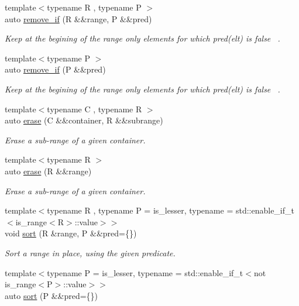 \begin{DoxyCompactItemize}
{\footnotesize template$<$typename R , typename P $>$ }\\auto \mbox{\hyperlink{namespacerah_afba9495316f20f6caee735c15feb349c}{remove\+\_\+if}} (R \&\&range, P \&\&pred)
\begin{DoxyCompactList}\small\item\em Keep at the begining of the range only elements for which pred(elt) is false~\newline
. \end{DoxyCompactList}\item 
{\footnotesize template$<$typename P $>$ }\\auto \mbox{\hyperlink{namespacerah_af598cf91c554f6d6938c320578e6bb02}{remove\+\_\+if}} (P \&\&pred)
\begin{DoxyCompactList}\small\item\em Keep at the begining of the range only elements for which pred(elt) is false~\newline
. \end{DoxyCompactList}\item 
{\footnotesize template$<$typename C , typename R $>$ }\\auto \mbox{\hyperlink{namespacerah_a3b055c0e04f784b9abc89a27ef4534dd}{erase}} (C \&\&container, R \&\&subrange)
\begin{DoxyCompactList}\small\item\em Erase a sub-\/range of a given container. \end{DoxyCompactList}\item 
{\footnotesize template$<$typename R $>$ }\\auto \mbox{\hyperlink{namespacerah_a80ea7a94642c23e9f3db6f6b890f2987}{erase}} (R \&\&range)
\begin{DoxyCompactList}\small\item\em Erase a sub-\/range of a given container. \end{DoxyCompactList}\item 
{\footnotesize template$<$typename R , typename P  = is\+\_\+lesser, typename  = std\+::enable\+\_\+if\+\_\+t$<$is\+\_\+range$<$\+R$>$\+::value$>$$>$ }\\void \mbox{\hyperlink{namespacerah_a02bc4f7618438272f7ec9f3c819d5990}{sort}} (R \&range, P \&\&pred=\{\})
\begin{DoxyCompactList}\small\item\em Sort a range in place, using the given predicate. \end{DoxyCompactList}\item 
{\footnotesize template$<$typename P  = is\+\_\+lesser, typename  = std\+::enable\+\_\+if\+\_\+t$<$not is\+\_\+range$<$\+P$>$\+::value$>$$>$ }\\auto \mbox{\hyperlink{namespacerah_a3a938d529ef4564281a5dca2ce49b538}{sort}} (P \&\&pred=\{\})

\end{DoxyCompactItemize}
